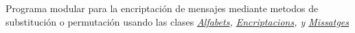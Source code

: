 Programa modular para la encriptación de mensajes mediante metodos de substitución o permutación usando las clases {\itshape \mbox{\hyperlink{class_alfabets}{Alfabets}}{\itshape , {\itshape \mbox{\hyperlink{class_encriptacions}{Encriptacions}}{\itshape , y {\itshape \mbox{\hyperlink{class_missatges}{Missatges}}{\itshape  }}}}}}